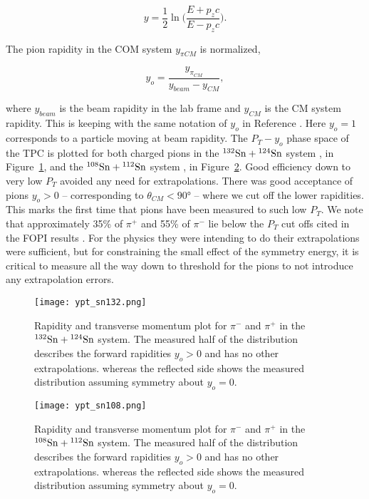 \begin{equation}
y = \frac{1}{2} \ln\Big( \frac{E + p_zc}{E - p_zc}\Big).
\end{equation}

The pion rapidity in the COM system $y_{\pi CM}$ is normalized,

\begin{equation}
y_o = \frac{y_{\pi_{CM}}}{y_{beam} - y_{CM}},
\end{equation}

where $y_{beam}$ is the beam rapidity in the lab frame and $y_{CM}$ is the CM system rapidity. This is keeping with the same notation of $y_o$ in Reference \cite{fopi}. Here $y_o = 1$ corresponds to a particle moving at beam rapidity. The   $P_T - y_o$ phase space of the \spirit TPC is plotted for both charged pions in the ${}^{132}\mathrm{Sn} + {}^{124}\mathrm{Sn}$ system , in Figure~\ref{fig:ptrap_sn132}, and the ${}^{108}\mathrm{Sn} + {}^{112}\mathrm{Sn}$ system , in Figure~\ref{fig:ptrap_sn108}. Good efficiency down to very low $P_T$ avoided any need for extrapolations. There was good acceptance of pions $y_o > 0$ -- corresponding to $\theta_{CM} < \ang{90}$ -- where we cut off the lower rapidities. This marks the first time that pions have been measured to such low $P_T$. We note that approximately 35\% of $\pi^+$ and 55\% of $\pi^-$ lie below the $P_T$ cut offs cited in the FOPI results \cite{fopi}. For the physics they were intending to do their extrapolations were sufficient, but for constraining the small effect of the symmetry energy, it is critical to measure all the way down to threshold for the pions to not introduce any extrapolation errors.

\begin{figure}[!htb]
\centering
\texttt{[image: ypt\_sn132.png]}
\caption{Rapidity and transverse momentum plot for $\pi^-$ and $\pi^+$ in the ${}^{132}\mathrm{Sn} + {}^{124}\mathrm{Sn}$ system. The measured half of the distribution describes the forward rapidities $y_o > 0$ and has no other extrapolations. whereas the reflected side shows the measured distribution assuming symmetry about $y_o = 0$.}
\label{fig:ptrap_sn132}
\end{figure}


\begin{figure}[!htb]
\centering
\texttt{[image: ypt\_sn108.png]}
\caption{Rapidity and transverse momentum plot for $\pi^-$ and $\pi^+$ in the ${}^{108}\mathrm{Sn} + {}^{112}\mathrm{Sn}$ system. The measured half of the distribution describes the forward rapidities $y_o > 0$ and has no other extrapolations. whereas the reflected side shows the measured distribution assuming symmetry about $y_o = 0$.}
\label{fig:ptrap_sn108}
\end{figure}

